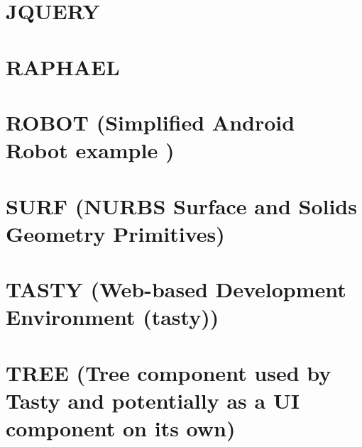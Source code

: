 \documentclass [11pt]{book}
\begin{document}
\section{JQUERY }

\label{sec:jquery}







\section{RAPHAEL }

\label{sec:raphael}







\section{ROBOT (Simplified Android Robot example )}

\label{sec:robot(simplifiedandroidrobotexample)}







\section{SURF (NURBS Surface and Solids Geometry Primitives)}

\label{sec:surf(nurbssurfaceandsolidsgeometryprimitives)}







\section{TASTY (Web-based Development Environment (tasty))}

\label{sec:tasty(web-baseddevelopmentenvironment(tasty))}







\section{TREE (Tree component used by Tasty and potentially as a UI component on its own)}

\label{sec:tree(treecomponentusedbytastyandpotentiallyasauicomponentonitsown)}
\end{document}
